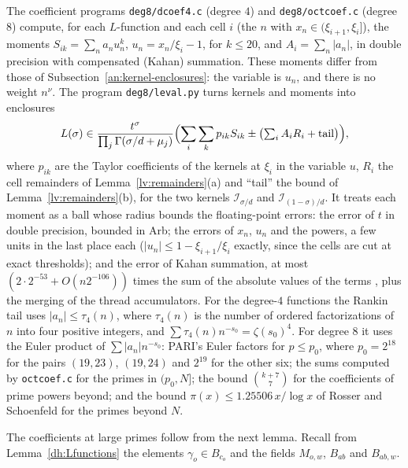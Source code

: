 The coefficient programs \texttt{deg8/dcoef4.c} (degree $4$) and
\texttt{deg8/octcoef.c} (degree $8$) compute, for each $L$-function and each
cell $i$ (the $n$ with $x_n\in(\xi_{i+1},\xi_i]$), the moments
$S_{ik}=\sum_na_nu_n^k$, $u_n=x_n/\xi_i-1$, for $k\le20$, and
$A_i=\sum_n|a_n|$, in double precision with compensated (Kahan) summation.
These moments differ from those of Subsection~\ref{an:kernel-enclosures}:
the variable is $u_n$, and there is no weight $n^\nu$. The program
\texttt{deg8/leval.py} turns kernels and moments into enclosures
\[
 L(\sigma)\in\frac{t^\sigma}{\prod_j\Gamma(\sigma/d+\mu_j)}\Bigl(\sum_i\sum_kp_{ik}S_{ik}
 \pm\bigl(\textstyle\sum_iA_iR_i+\text{tail}\bigr)\Bigr),
\]
where $p_{ik}$ are the Taylor coefficients of the kernels at $\xi_i$ in the
variable $u$, $R_i$ the cell remainders of Lemma~\ref{lv:remainders}(a) and
``tail'' the bound of Lemma~\ref{lv:remainders}(b), for the two kernels
$\mathcal I_{\sigma/d}$ and $\mathcal I_{(1-\sigma)/d}$. It treats each moment
as a ball whose radius bounds the floating-point errors: the error of $t$ in
double precision, bounded in Arb; the errors of $x_n$, $u_n$ and the powers,
a few units in the last place each ($|u_n|\le1-\xi_{i+1}/\xi_i$ exactly, since the
cells are cut at exact thresholds); and the error of Kahan summation, at most
$(2\cdot2^{-53}+O(n2^{-106}))$ times the sum of the absolute values of the
terms \cite[Section~4.3]{Higham2002}, plus the merging of the thread
accumulators. For the degree-$4$ functions the Rankin tail uses
$|a_n|\le\tau_4(n)$, where $\tau_4(n)$ is the number of ordered
factorizations of $n$ into four positive integers, and
$\sum\tau_4(n)n^{-s_0}=\zeta(s_0)^4$. For degree $8$ it uses the Euler
product of $\sum|a_n|n^{-s_0}$: PARI's Euler factors for $p\le p_0$, where
$p_0=2^{18}$ for the pairs $(19,23)$, $(19,24)$ and $2^{19}$ for the other
six; the sums computed by \texttt{octcoef.c} for the primes in $(p_0,N]$; the
bound $\binom{k+7}7$ for the coefficients of prime powers beyond; and the
bound $\pi(x)\le1.25506\,x/\log x$ of Rosser and Schoenfeld
\cite{RosserSchoenfeld1962} for the primes beyond $N$.

The coefficients at large primes follow from the next lemma. Recall from
Lemma~\ref{dh:Lfunctions} the elements $\gamma_o\in B_{c_o}$ and the fields
$M_{o,w}$, $B_{ab}$ and $B_{ab,w}$.

